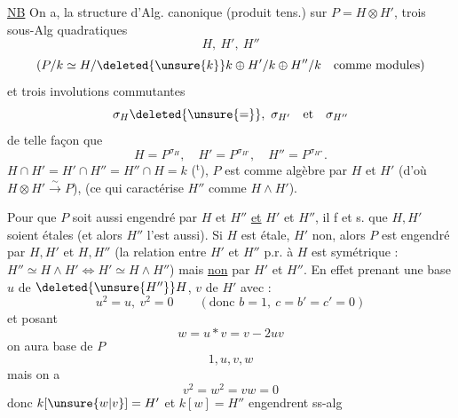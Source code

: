 \uline{NB} On a,  la structure d'Alg.  canonique (produit tens.) sur $P=H\otimes H'$, trois sous-Alg quadratiques
\[
 H,\ H',\ H''
\]
\[
 (P/k\simeq H/\deleted{\unsure{k}}k\oplus H'/k\oplus H''/k\quad\text{comme modules})
\]
et trois involutions  commutantes
\[
 \sigma_H\deleted{\unsure{=}},\ \sigma_{H'}\quad\text{et}\quad\sigma_{H''}
\]
de telle façon que
\[
 H=P^{\sigma_H},\quad H'=P^{\sigma_{H'}},\quad H''=P^{\sigma_{H''}}.
\]
  $H\cap H'=H'\cap H''=H''\cap H=k$ ($^{\mathrm t}$),  $P$ est  comme algèbre par $H$ et $H'$ (d'où $H\otimes H'\overset{\sim}{\longrightarrow}P$),  (ce qui caractérise $H''$ comme $H\wedge H'$).

Pour que $P$ soit aussi engendré par $H$ et $H''$ \uline{et} $H'$ et $H''$, il f et s. que $H,H'$ soient étales (et alors $H''$ l'est aussi). Si $H$ est étale, $H'$ non,  alors $P$ est engendré par $H,H'$ et $H,H''$ (la relation entre $H'$ et $H''$ p.r. à $H$ est symétrique : $H''\simeq H\wedge H'\iff H'\simeq H\wedge H''$) mais \uline{non} par $H'$ et $H''$. En effet prenant une base $u$ de $\deleted{\unsure{H''}}H$, $v$ de $H'$ avec :
\[
 u^2=u,\ v^2=0\qquad(\text{donc }b=1,\ c=b'=c'=0)
\]
et posant
\[
 w=u\ast v=v-2uv
\]
on aura   base de $P$
\[
 1,u,v,w
\]
mais on a
\[
 v^2=w^2=vw=0
\]
donc $k[\unsure{w|v}]=H'$ et $k[w]=H''$ engendrent ss-alg

